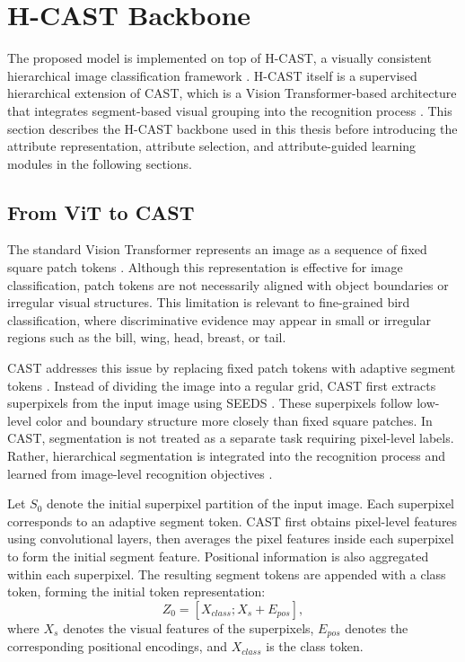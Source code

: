 \section{H-CAST Backbone}

The proposed model is implemented on top of H-CAST, a visually consistent hierarchical image classification framework \cite{park2025visually}. H-CAST itself is a supervised hierarchical extension of CAST, which is a Vision Transformer-based architecture that integrates segment-based visual grouping into the recognition process \cite{ke2024learning}. This section describes the H-CAST backbone used in this thesis before introducing the attribute representation, attribute selection, and attribute-guided learning modules in the following sections.

\subsection{From ViT to CAST}

The standard Vision Transformer represents an image as a sequence of fixed square patch tokens \cite{dosovitskiy2020image}. Although this representation is effective for image classification, patch tokens are not necessarily aligned with object boundaries or irregular visual structures. This limitation is relevant to fine-grained bird classification, where discriminative evidence may appear in small or irregular regions such as the bill, wing, head, breast, or tail.

CAST addresses this issue by replacing fixed patch tokens with adaptive segment tokens \cite{ke2024learning}. Instead of dividing the image into a regular grid, CAST first extracts superpixels from the input image using SEEDS \cite{van2015seeds, ke2024learning}. These superpixels follow low-level color and boundary structure more closely than fixed square patches. In CAST, segmentation is not treated as a separate task requiring pixel-level labels. Rather, hierarchical segmentation is integrated into the recognition process and learned from image-level recognition objectives \cite{ke2024learning}.

Let \(S_0\) denote the initial superpixel partition of the input image. Each superpixel corresponds to an adaptive segment token. CAST first obtains pixel-level features using convolutional layers, then averages the pixel features inside each superpixel to form the initial segment feature. Positional information is also aggregated within each superpixel. The resulting segment tokens are appended with a class token, forming the initial token representation:
\begin{equation}
    Z_0 = [X_{class}; X_s + E_{pos}],
\end{equation}
where \(X_s\) denotes the visual features of the superpixels, \(E_{pos}\) denotes the corresponding positional encodings, and \(X_{class}\) is the class token.

